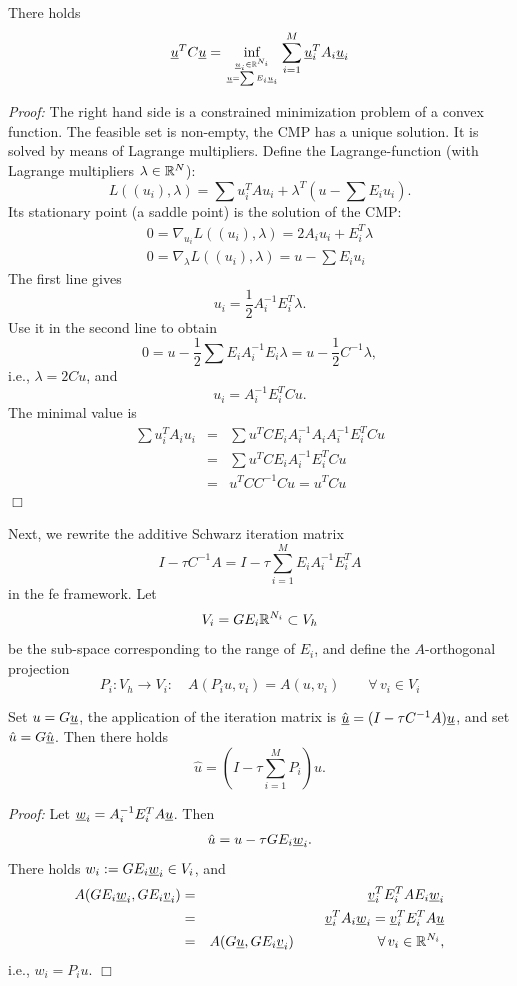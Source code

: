 \begin{lemma} \label{lemma_aslinalg}
There holds
$$
\underline u^T C \underline u = \inf_{\underline u_i \in {\mathbb R}^{N_i} \atop \underline u = \sum E_i \underline u_i} \sum_{i=1}^M  \underline u_i^T A_i \underline u_i
$$
\end{lemma}
{\em Proof:} The right hand side is a constrained minimization problem of 
a convex function. The feasible set is non-empty, the CMP has a unique solution.
It is solved by means of Lagrange multipliers. Define the Lagrange-function
(with Lagrange multipliers $\lambda \in {\mathbb R}^N$):
$$
L ( (u_i), \lambda) = \sum u_i^T A u_i + \lambda^T (u - \sum E_i u_i).
$$
Its stationary point (a saddle point) is the solution of the CMP:
\begin{eqnarray*}
0 = \nabla_{u_i} L( (u_i), \lambda) = 2 A_i u_i + E_i^T \lambda \\
0 = \nabla_\lambda L ( (u_i), \lambda) = u - \sum E_i u_i
\end{eqnarray*}
The first line gives
$$
u_i = \frac{1}{2} A_i^{-1} E_i^T \lambda.
$$
Use it in the second line to obtain
$$
0 = u - \frac{1}{2} \sum E_i A_i^{-1} E_i \lambda = u - \frac{1}{2} C^{-1} \lambda,
$$
i.e., $\lambda = 2 C u$, and
$$
u_i = A_i^{-1} E_i^T C u.
$$
The minimal value is
\begin{eqnarray*}
\sum u_i^T A_i u_i & = & \sum u^T C E_i A_i^{-1} A_i A_i^{-1} E_i^T C u  \\
        & = & \sum u^T C E_i A_i^{-1} E_i^T C u \\
        & = & u^T C C^{-1} C u = u^T C u
\end{eqnarray*}
\hfill $\Box$

\bigskip

Next, we rewrite the additive Schwarz iteration matrix 
$$
I - \tau C^{-1} A = I - \tau \sum_{i=1}^M E_i A_i^{-1} E_i^T A
$$
in the fe framework. Let 
$$
V_i = G E_i {\mathbb R}^{N_i} \subset V_h
$$
be the sub-space corresponding to the range of $E_i$, and define the $A$-orthogonal projection
$$
P_i : V_h \rightarrow V_i : \quad A(P_i u, v_i) = A(u, v_i) \qquad \forall \, v_i \in V_i
$$
\begin{lemma} Set $u = G \underline u$, the application of the iteration matrix is
$ \hat {\underline u} = (I-\tau C^{-1} A) \underline u$, and set $\hat u = G \hat {\underline u}$.
Then there holds
$$
\hat u = \left( I - \tau \sum_{i=1}^M P_i \right) u.
$$
\end{lemma}
{\em Proof:} Let $\underline w_i = A_i^{-1} E_i^T A \underline u$. Then
$$
\hat u = u - \tau G E_i \underline w_i.
$$
There holds $w_i := G E_i \underline w_i \in V_i$, and
\begin{eqnarray*}
A(G E_i \underline w_i, G E_i \underline v_i) 
        & = & \underline v_i^T E_i^T A E_i \underline w_i  \\
        & = & \underline v_i^T A_i \underline w_i = \underline v_i^T E_i^T A \underline u \\
        & = & A(G \underline u, G E_i \underline v_i) \qquad \qquad \qquad \forall \, v_i \in {\mathbb R}^{N_i},
\end{eqnarray*}
i.e., $w_i = P_i u$.
\hfill $\Box$

